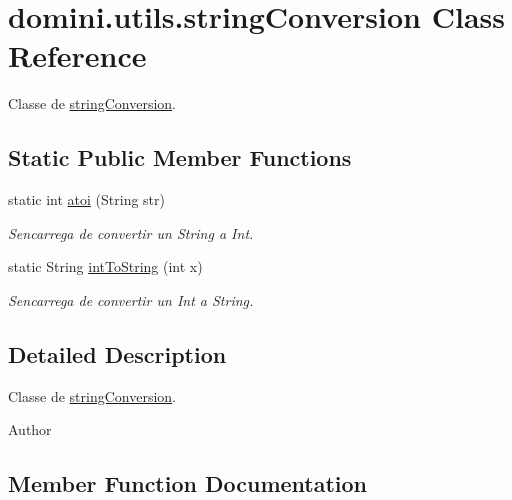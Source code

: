\hypertarget{classdomini_1_1utils_1_1stringConversion}{}\section{domini.\+utils.\+string\+Conversion Class Reference}
\label{classdomini_1_1utils_1_1stringConversion}


Classe de \hyperlink{classdomini_1_1utils_1_1stringConversion}{string\+Conversion}.  


\subsection*{Static Public Member Functions}
\begin{DoxyCompactItemize}
\item 
static int \hyperlink{classdomini_1_1utils_1_1stringConversion_ac5d58fb65893c40fc46af0fae55772ca}{atoi} (String str)
\begin{DoxyCompactList}\small\item\em S\textquotesingle{}encarrega de convertir un String a Int. \end{DoxyCompactList}\item 
static String \hyperlink{classdomini_1_1utils_1_1stringConversion_ab10fa673e68698a6a0f29971a60fe274}{int\+To\+String} (int x)
\begin{DoxyCompactList}\small\item\em S\textquotesingle{}encarrega de convertir un Int a String. \end{DoxyCompactList}\end{DoxyCompactItemize}


\subsection{Detailed Description}
Classe de \hyperlink{classdomini_1_1utils_1_1stringConversion}{string\+Conversion}. 

\begin{DoxyAuthor}{Author}

\end{DoxyAuthor}


\subsection{Member Function Documentation}
\mbox{\label{classdomini_1_1utils_1_1stringConversion_ac5d58fb65893c40fc46af0fae55772ca}} 
